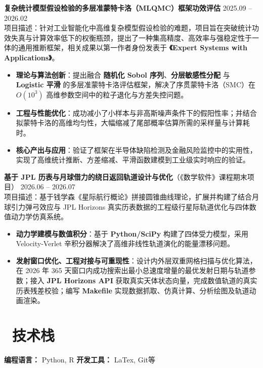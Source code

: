 \documentclass[11pt]{article}
\newlength{\interProjectSpacing}
\newcommand{\projectsep}{\vspace{\interProjectSpacing}}
\newlength{\intraProjectTitleSep}
\newcommand{\titlebreak}{\\[\intraProjectTitleSep]}
\newlength{\intraProjectListTopSep}
\begin{document}
\textbf{复杂统计模型假设检验的多层准蒙特卡洛（MLQMC）框架功效评估} \hfill 2025.09 -- 2026.02 \titlebreak
项目描述：针对工业智能化中高维复杂模型假设检验的难题，项目旨在突破统计功效失真与计算效率低下的权衡瓶颈，提出了一种集高精度、高效率与强稳定性于一体的通用推断框架，相关成果以第一作者身份发表于 \textbf{《Expert Systems with Applications》}。
\begin{itemize}[nosep, topsep=\intraProjectListTopSep]
    \item \textbf{理论与算法创新}：提出融合 \textbf{随机化 Sobol 序列}、\textbf{分层敏感性分配} 与 \textbf{Logistic 平滑} 的多层准蒙特卡洛评估框架，解决了序贯蒙特卡洛（SMC）在 $O(10^3)$ 高维参数空间中的粒子退化与方差失控问题。
    \item \textbf{工程与性能优化}：成功减小了小样本与非高斯噪声条件下的假阳性率；并结合拟蒙特卡洛的高维均匀性，大幅缩减了尾部概率估算所需的采样量与计算耗时。
    \item \textbf{核心产出与应用}：验证了框架在半导体缺陷检测及金融风险监控中的实用性，实现了高维统计推断、方差缩减、平滑函数建模到工业级实时响应的验证。
\end{itemize}

\projectsep

\textbf{基于 JPL 历表与月球借力的绕日返回轨道设计与优化}（《数学软件》课程期末项目） \hfill 2026.06 -- 2026.07 \titlebreak
项目描述：基于钱学森《星际航行概论》拼接圆锥曲线理论，扩展并构建了结合月球引力弹弓效应与 JPL Horizons 真实历表数据的工程级行星际轨道优化与四体数值动力学仿真系统。
\begin{itemize}[nosep, topsep=\intraProjectListTopSep]
    \item \textbf{动力学建模与数值积分}：基于 \textbf{Python/SciPy} 构建了四体受力模型，采用 Velocity-Verlet 辛积分器解决了高维非线性轨道演化的能量漂移问题。
    \item \textbf{发射窗口优化、工程对接与可重现性}：设计内外层双重网格扫描与优化算法，在 2026 年 365 天窗口内成功搜索出最小总速度增量的最优发射日期与轨道参数；接入 \textbf{JPL Horizons API} 获取真实天体状态向量，完成数值轨道的真实历表残差校验；编写 \textbf{Makefile} 实现数据抓取、仿真计算、分析绘图及轨道动画渲染。
\end{itemize}

\section{\makebox[\widthof{\faCogs}][c]{\color{CVBlue}\faCogs}\ 技术栈}
    \textbf{编程语言：} Python, R \quad \textbf{开发工具：} LaTex, Git等
\end{document}
